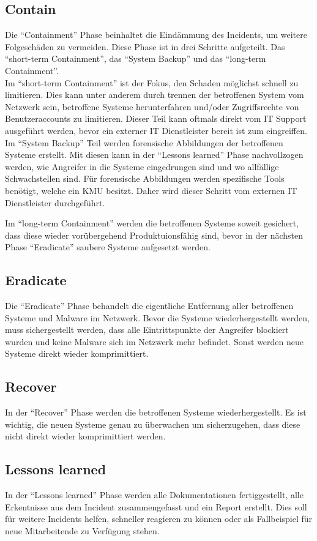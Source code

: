 \subsection{Contain}
Die ``Containment'' Phase beinhaltet die Eindämmung des Incidents, um weitere Folgeschäden zu vermeiden.
Diese Phase ist in drei Schritte aufgeteilt. 
Das ``short-term Containment'', das ``System Backup'' und das ``long-term Containment''.\\

Im ``short-term Containment'' ist der Fokus, den Schaden möglichst schnell zu limitieren.
Dies kann unter anderem durch trennen der betroffenen System vom Netzwerk sein, betroffene Systeme herunterfahren und/oder Zugriffsrechte von Benutzeraccounts zu limitieren.
Dieser Teil kann oftmals direkt vom IT Support ausgeführt werden, bevor ein externer IT Dienstleister bereit ist zum eingreiffen.\\

Im ``System Backup'' Teil werden forensische Abbildungen der betroffenen Systeme erstellt.
Mit diesen kann in der ``Lessons learned'' Phase nachvollzogen werden, wie Angreifer in die Systeme eingedrungen sind und wo allfällige Schwachstellen sind. 
Für forensische Abbildungen werden spezifische Tools benötigt, welche ein KMU besitzt. 
Daher wird dieser Schritt vom externen IT Dienstleister durchgeführt.

Im ``long-term Containment'' werden die betroffenen Systeme soweit gesichert, dass diese wieder vorübergehend Produktuionsfähig sind, bevor in der nächsten Phase ``Eradicate'' saubere Systeme aufgesetzt werden.

\subsection{Eradicate}
Die ``Eradicate'' Phase behandelt die eigentliche Entfernung aller betroffenen Systeme und Malware im Netzwerk.
Bevor die Systeme wiederhergestellt werden, muss sichergestellt werden, dass alle Eintrittspunkte der Angreifer blockiert wurden und keine Malware sich im Netzwerk mehr befindet.
Sonst werden neue Systeme direkt wieder komprimittiert.

\subsection{Recover}
In der ``Recover'' Phase werden die betroffenen Systeme wiederhergestellt.
Es ist wichtig, die neuen Systeme genau zu überwachen um sicherzugehen, dass diese nicht direkt wieder komprimittiert werden. 


\subsection{Lessons learned}
In der ``Lessons learned'' Phase werden alle Dokumentationen fertiggestellt, alle Erkentnisse aus dem Incident zusammengefasst und ein Report erstellt.
Dies soll für weitere Incidents helfen, schneller reagieren zu können oder als Fallbeispiel für neue Mitarbeitende zu Verfügung stehen. 